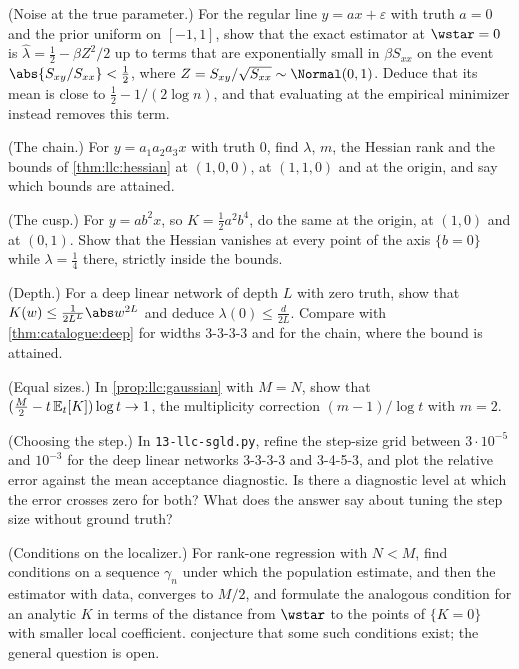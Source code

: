 \begin{refsection}
\begin{exercises}
\item \consolidation (Noise at the true parameter.) For the regular line $y=ax+\varepsilon$ with truth $a=0$ and the prior uniform on $[-1,1]$, show that the exact estimator at $\wstar=0$ is $\hat\lambda=\tfrac12-\beta Z^2/2$ up to terms that are exponentially small in $\beta S_{xx}$ on the event $\abs{S_{xy}/S_{xx}}<\tfrac12$, where $Z=S_{xy}/\sqrt{S_{xx}}\sim\Normal(0,1)$. Deduce that its mean is close to $\tfrac12-1/(2\log n)$, and that evaluating at the empirical minimizer instead removes this term.\label{ex:llc:noise}

\item \byhand (The chain.) For $y=a_1a_2a_3x$ with truth $0$, find $\lambda$, $m$, the Hessian rank and the bounds of \cref{thm:llc:hessian} at $(1,0,0)$, at $(1,1,0)$ and at the origin, and say which bounds are attained.\label{ex:llc:chain}

\item \byhand (The cusp.) For $y=ab^2x$, so $K=\tfrac12a^2b^4$, do the same at the origin, at $(1,0)$ and at $(0,1)$. Show that the Hessian vanishes at every point of the axis $\{b=0\}$ while $\lambda=\tfrac14$ there, strictly inside the bounds.\label{ex:llc:cusp}

\item \byhand (Depth.) For a deep linear network of depth $L$ with zero truth, show that $K(w)\le\frac1{2L^L}\abs w^{2L}$ and deduce $\lambda(0)\le\frac d{2L}$. Compare with \cref{thm:catalogue:deep} for widths $3$-$3$-$3$-$3$ and for the chain, where the bound is attained.\label{ex:llc:depth}

\item \variation (Equal sizes.) In \cref{prop:llc:gaussian} with $M=N$, show that $(\frac M2-t\,\mathbb{E}_{t}\!\left[K\right])\log t\to1$, the multiplicity correction $(m-1)/\log t$ with $m=2$. \label{ex:llc:equal}

\item \measurement (Choosing the step.) In \texttt{13-llc-sgld.py}, refine the step-size grid between $3\cdot10^{-5}$ and $10^{-3}$ for the deep linear networks 3-3-3-3 and 3-4-5-3, and plot the relative error against the mean acceptance diagnostic. Is there a diagnostic level at which the error crosses zero for both? What does the answer say about tuning the step size without ground truth?\label{ex:llc:tune}

\item \research (Conditions on the localizer.) For rank-one regression with $N<M$, find conditions on a sequence $\gamma_n$ under which the population estimate, and then the estimator with data, converges to $M/2$, and formulate the analogous condition for an analytic $K$ in terms of the distance from $\wstar$ to the points of $\{K=0\}$ with smaller local coefficient. \textcite{LauEtAl2025} conjecture that some such conditions exist; the general question is open.\label{ex:llc:research}
\end{exercises}


\end{refsection}
